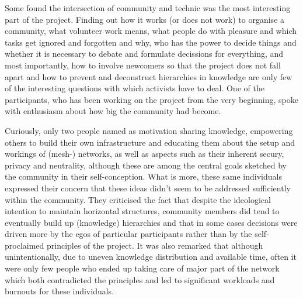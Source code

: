 Some found the intersection of community and technic was the most interesting part of the project.
Finding out how it works (or does not work) to organise a community, what volunteer work means, what people do with pleasure and which tasks get ignored and forgotten and why, who has the power to decide things and whether it is necessary to debate and formulate decissions for everything, and most importantly, how to involve newcomers so that the project does not fall apart and how to prevent and deconstruct hierarchies in knowledge are only few of the interesting questions with which activists have to deal.
One of the participants, who has been working on the project from the very beginning, spoke with enthusiasm about how big the community had become.

Curiously, only two people named as motivation sharing knowledge, empowering others to build their own infrastructure and educating them about the setup and workings of (mesh-) networks, as well as aspects such as their inherent secury, privacy and neutrality, although these are among the central goals sketched by the community in their self-conception\cite{ffweb}.
What is more, these same individuals expressed their concern that these ideas didn't seem to be addressed sufficiently within the community.
They criticised the fact that despite the ideological intention to maintain horizontal structures, community members did tend to eventually build up (knowledge) hierarchies and that in some cases decisions were driven more by the egos of particular participants rather than by the self-proclaimed principles of the project.
It was also remarked that although unintentionally, due to uneven knowledge distribution and available time, often it were only few people who ended up taking care of major part of the network which both contradicted the principles and led to significant workloads and burnouts for these individuals.

\begin{comment}
Many of the interviewed only started to actively participate in Freifunk after attending some kind of event: be it a local community meeting, meeting activists at the Chaos Communication Congress or other kinds of conferences.
\end{comment}

